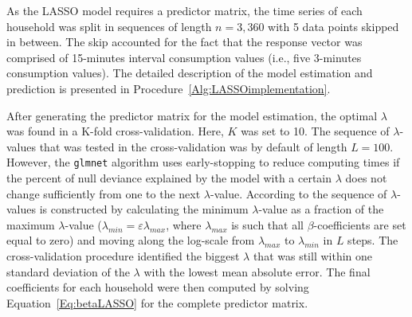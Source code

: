 As the LASSO model requires a predictor matrix, the time series of each household was split in sequences of length $n=3,360$ with 5 data points skipped in between. The skip accounted for the fact that the response vector was comprised of 15-minutes interval consumption values (i.e., five 3-minutes consumption values). The detailed description of the model estimation and prediction is presented in Procedure~\ref{Alg:LASSOimplementation}.

After generating the predictor matrix for the model estimation, the optimal $\lambda$ was found in a K-fold cross-validation. Here, $K$ was set to 10. The sequence of $\lambda$-values that was tested in the cross-validation was by default of length $L=100$. However, the \texttt{glmnet} algorithm uses early-stopping to reduce computing times if the percent of null deviance explained by the model with a certain $\lambda$ does not change sufficiently from one to the next $\lambda$-value. According to \citet{Friedman:2010} the sequence of $\lambda$-values is constructed by calculating the minimum $\lambda$-value as a fraction of the maximum $\lambda$-value ($\lambda_{min}=\varepsilon\lambda_{max}$, where $\lambda_{max}$ is such that all $\beta$-coefficients are set equal to zero) and moving along the log-scale from $\lambda_{max}$ to $\lambda_{min}$ in $L$ steps. The cross-validation procedure identified the biggest $\lambda$ that was still within one standard deviation of the $\lambda$ with the lowest mean absolute error. The final coefficients for each household were then computed by solving Equation~\ref{Eq:betaLASSO} for the complete predictor matrix.\\


